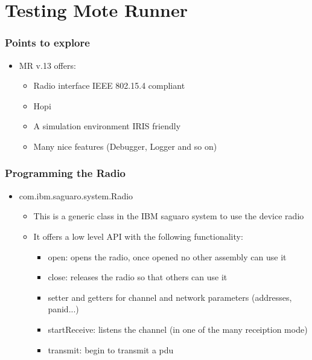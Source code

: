 \section{Testing Mote Runner}
\begin{frame}[fragile]
  \frametitle{Points to explore}
  \begin{itemize}
    \item MR v.13 offers:
    \begin{itemize}
    	\item Radio interface IEEE 802.15.4 compliant
    	\item Hopi
    	\item A simulation environment IRIS friendly
    	\item Many nice features (Debugger, Logger and so on)
    \end{itemize}
  \end{itemize}
\end{frame}

\begin{frame}[fragile]
  \frametitle{Programming the Radio}
  \begin{itemize}
    \item com.ibm.saguaro.system.Radio
    \begin{itemize}
    	\item This is a generic class in the IBM saguaro system to use the device radio
    	\item It offers a low level API with the following functionality:
    	\begin{itemize}
	  \item open: opens the radio, once opened no other assembly can use it
	  \item close: releases the radio so that others can use it
	  \item setter and getters for channel and network parameters (addresses, panid...)
	  \item startReceive: listens the channel (in one of the many receiption mode)
	  \item transmit: begin to transmit a pdu
    	\end{itemize}
    \end{itemize}
  \end{itemize}
\end{frame}

